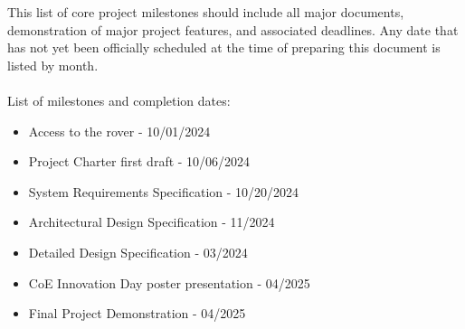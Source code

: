 This list of core project milestones should include all major documents, demonstration of major project features, and associated deadlines. Any date that has not yet been officially scheduled at the time of preparing this document is listed by month.
\\\\
List of milestones and completion dates:
\begin{itemize}
  \item Access to the rover - 10/01/2024
  \item Project Charter first draft - 10/06/2024
  \item System Requirements Specification - 10/20/2024
  \item Architectural Design Specification - 11/2024
  \item Detailed Design Specification - 03/2024
  \item CoE Innovation Day poster presentation - 04/2025
  \item Final Project Demonstration - 04/2025
\end{itemize}